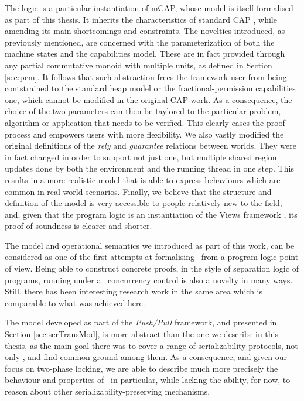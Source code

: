 The logic is a particular instantiation of mCAP, whose model is itself formalised as part of this thesis. It inherits the characteristics of standard CAP \cite{cap}, while amending its main shortcomings and constraints. The novelties introduced, as previously mentioned, are concerned with the parameterization of both the machine states and the capabilities model. These are in fact provided through any partial commutative monoid with multiple units, as defined in Section \ref{sec:pcm}. It follows that such abstraction frees the framework user from being contstrained to the standard heap model or the fractional-permission capabilities \cite{fractional} one, which cannot be modified in the original CAP work. As a consequence, the choice of the two parameters can then be taylored to the particular problem, algorithm or application that needs to be verified. This clearly eases the proof process and empowers users with more flexibility. We also vastly modified the original definitions of the \textit{rely} and \textit{guarantee} relations between worlds. They were in fact changed in order to support not just one, but multiple shared region updates done by both the environment and the running thread in one step. This results in a more realistic model that is able to express behaviours which are common in real-world scenarios. Finally, we believe that the structure and definition of the model is very accessible to people relatively new to the field, and, given that the program logic is an instantiation of the Views framework \cite{views}, its proof of soundness is clearer and shorter.

The model and operational semantics we introduced as part of this work, can be considered as one of the first attempts at formalising \tpl\ from a program logic point of view. Being able to construct concrete proofs, in the style of separation logic of programs, running under a \tpl\ concurrency control is also a novelty in many ways. Still, there has been interesting research work in the same area which is comparable to what was achieved here.

The model developed as part of the \textit{Push/Pull} framework, and presented in Section \ref{sec:serTransMod}, is more abstract than the one we describe in this thesis, as the main goal there was to cover a range of serializability protocols, not only \tpl, and find common ground among them. As a consequence, and given our focus on two-phase locking, we are able to describe much more precisely the behaviour and properties of \tpl\ in particular, while lacking the ability, for now, to reason about other serializability-preserving mechanisms.
	
